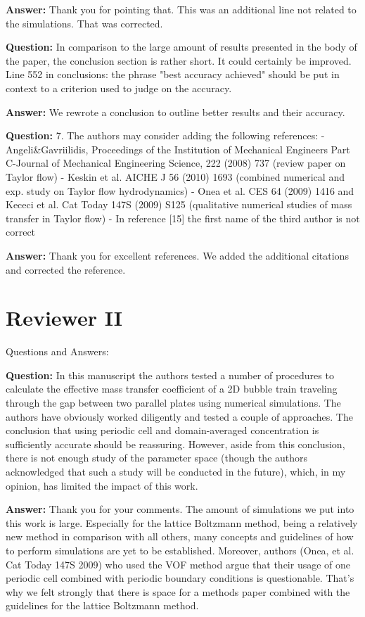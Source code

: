 \documentclass{article}
\begin{document}
\textbf{Answer:} Thank you for pointing that. This was an additional line not related to the simulations. That was corrected.

\textbf{Question:} In comparison to the large amount of results presented in the body of the paper, the conclusion section is rather short. It could certainly be improved. Line 552 in conclusions: the phrase "best accuracy achieved" should be put in context to a criterion used to judge on the accuracy.

\textbf{Answer:} We rewrote a conclusion to outline better results and their accuracy.

\textbf{Question:} 7. The authors may consider adding the following references:
- Angeli\&Gavriilidis, Proceedings of the Institution of Mechanical Engineers Part C-Journal of Mechanical Engineering Science, 222 (2008) 737 (review paper on Taylor flow)
- Keskin et al. AICHE J 56 (2010) 1693 (combined numerical and exp. study on Taylor flow hydrodynamics)
- Onea et al. CES 64 (2009) 1416 and Kececi et al. Cat Today 147S (2009) S125 (qualitative numerical studies of mass transfer in Taylor flow)
- In reference [15] the first name of the third author is not correct

\textbf{Answer:} Thank you for excellent references. We added the additional citations and corrected the reference.

\section{Reviewer II}
Questions and Answers:

\textbf{Question:} In this manuscript the authors tested a number of procedures to calculate the effective mass transfer coefficient of a 2D bubble train traveling through the gap between two parallel plates using numerical simulations. The authors have obviously worked diligently and tested a couple of approaches. The conclusion that using periodic cell and domain-averaged concentration is sufficiently accurate should be reassuring. However, aside from this conclusion, there is not enough study of the parameter space (though the authors acknowledged that such a study will be conducted in the future), which, in my opinion, has limited the impact of this work.

\textbf{Answer:}  Thank you for your comments. The amount of simulations we put into this work is large. Especially for the lattice Boltzmann method, being a relatively new method in comparison with all others, many concepts and guidelines of how to perform simulations are yet to be established. Moreover, authors (Onea, et al. Cat Today 147S 2009) who used the VOF method argue that their usage of one periodic cell combined with periodic boundary conditions is questionable. That's why we felt strongly that there is space for a  methods paper combined with the guidelines for the lattice Boltzmann method.   
 
\end{document}
